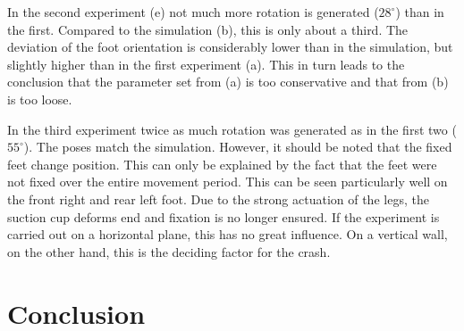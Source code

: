 \documentclass[letterpaper,10pt,conference]{ieeeconf}  %
\begin{document}
In the second experiment (e) not much more rotation is generated ($28^\circ$) than in the first.
Compared to the simulation (b), this is only about a third.
The deviation of the foot orientation is considerably lower than in the simulation, but slightly higher than in the first experiment (a).
This in turn leads to the conclusion that the parameter set from (a) is too conservative and that from (b) is too loose.
%
%

In the third experiment twice as much rotation was generated as in the first two ($55^\circ$).
The poses match the simulation.
However, it should be noted that the fixed feet change position.
This can only be explained by the fact that the feet were not fixed over the entire movement period.
This can be seen particularly well on the front right and rear left foot.
Due to the strong actuation of the legs, the suction cup deforms end and fixation is no longer ensured.
If the experiment is carried out on a horizontal plane, this has no great influence.
On a vertical wall, on the other hand, this is the deciding factor for the crash.


\section{Conclusion}
\end{document}

